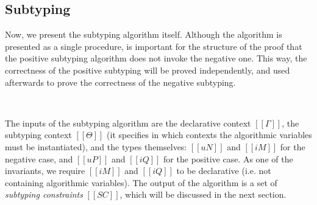 \documentclass[a4,natbib=false]{article}
\begin{document}
\subsection{Subtyping}
\label{sec:subtyping}

Now, we present the subtyping algorithm itself.
Although the algorithm is presented as a single procedure,
is important for the structure of the proof that the positive subtyping algorithm
does not invoke the negative one. This way, the correctness of the positive 
subtyping will be proved independently, and used afterwards to prove the
correctness of the negative subtyping.


\begin{algorithm}[Subtyping]
  \label{alg:subtyping}
  \hfill
  
  \begin{multicols}{2}
  \ottdefnANsub{}
  \columnbreak\\
  \ottdefnAPsup{}
  \end{multicols}
\end{algorithm}

The inputs of the subtyping algorithm are the declarative context $[[Γ]]$,
the subtyping context $[[Θ]]$ (it specifies in which contexts the algorithmic variables
must be instantiated), and the types themselves: $[[uN]]$ and $[[iM]]$ for the negative case,
and $[[uP]]$ and $[[iQ]]$ for the positive case. 
As one of the invariants, we require
$[[iM]]$ and $[[iQ]]$ to be declarative (i.e. not containing algorithmic variables).
The output of the algorithm is a set of \emph{subtyping constraints} $[[SC]]$,
which will be discussed in the next section.
\end{document}
